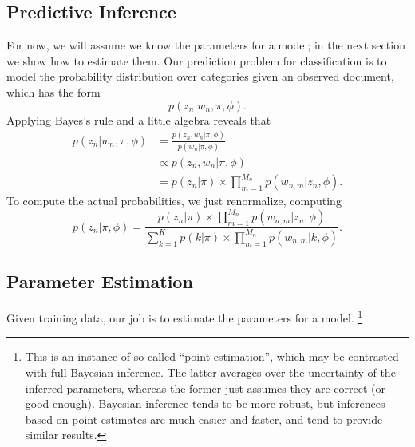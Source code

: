 \subsection{Predictive Inference}

For now, we will assume we know the parameters for a model; in
the next section we show how to estimate them.  Our prediction
problem for classification is to model the probability distribution
over categories given an observed document, which has the form
%
\begin{equation}
p(z_n | w_n, \pi, \phi).
\end{equation}
%
Applying Bayes's rule and a little algebra reveals that
%
\begin{align}
p(z_n|w_n, \pi, \phi) 
&{} = \frac{p(z_n,w_n|\pi,\phi)}{p(w_n|\pi,\phi)}\label{eq:naive-bayes-prob}
\\[6pt]
&{} \propto p(z_n,w_n|\pi,\phi) \nonumber
\\[3pt]
&{} = p(z_n|\pi) \times \prod_{m=1}^{M_n} p(w_{n,m}|z_n,\phi). \nonumber
\end{align}
%
To compute the actual probabilities, we just renormalize,
computing 
%
\begin{equation}
p(z_n|\pi,\phi) 
= \frac{p(z_n|\pi) \times \prod_{m=1}^{M_n} p(w_{n,m}|z_n,\phi)}
       {\sum_{k=1}^K p(k|\pi) \times \prod_{m=1}^{M_n} p(w_{n,m}|k,\phi)}.
\end{equation}


\subsection{Parameter Estimation}\label{section:naive-bayes-map}

Given training data, our job is to estimate the parameters for
a model.%
%
\footnote{This is an instance of so-called ``point estimation'', which
  may be contrasted with full Bayesian inference.  The latter averages
  over the uncertainty of the inferred parameters, whereas the former
  just assumes they are correct (or good enough).  Bayesian inference
  tends to be more robust, but inferences based on point estimates
  are much easier and faster, and tend to provide similar results.}

